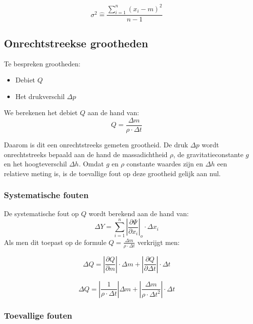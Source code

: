 \begin{equation}
    \sigma^{2} \hat{=} \frac{\sum\limits_{i=1}^n (x_i - m)^2}{n - 1}
\end{equation}


\subsection{Onrechtstreekse grootheden}

Te bespreken grootheden:
\begin{itemize}
    \item Debiet $Q$
    \item Het drukverschil $\Delta p$
\end{itemize}

We berekenen het debiet $Q$ aan de hand van: 
\begin{equation}
\label{debiet Q adhv rho, m en t}
    Q = \frac{\Delta m}{\rho \cdot \Delta t}
\end{equation}

Daarom is dit een onrechtstreeks gemeten grootheid.
De druk $\Delta p$ wordt onrechtstreeks bepaald aan de hand de massadichtheid $\rho$, de gravitatieconstante $g$ en het hoogteverschil $\Delta h$. Omdat $g$ en $\rho$ constante waardes zijn en $\Delta h$ een relatieve meting is, is de toevallige fout op deze grootheid gelijk aan nul.


\subsubsection{Systematische fouten}
De systematische fout op $Q$ wordt berekend aan de hand van:
\begin{equation}
    \Delta Y = \sum\limits_{i=1}^n \left|\frac{\partial \Psi}{\partial x_i}\right|_o \cdot \Delta x_i 
\end{equation}
Als men dit toepast op de formule $Q = \frac{\Delta m}{\rho \cdot \Delta t}$ verkrijgt men:

\begin{equation}
    \Delta Q = \left|\frac{\partial Q}{\partial m}\right|\cdot \Delta m + \left| \frac{\partial Q}{\partial \Delta t}\right| \cdot \Delta t
\end{equation}

\begin{equation}
    \Delta Q = \left|\frac{1}{\rho \cdot \Delta t}\right|\Delta m + \left|\frac{\Delta m}{\rho \cdot \Delta t^{2}}\right|\cdot \Delta t
\end{equation}


\subsubsection{Toevallige fouten}



